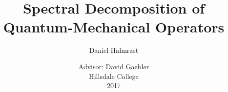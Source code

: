 \documentclass[12pt]{article}
\author{Daniel Halmrast}
\title{Spectral Decomposition of Quantum-Mechanical Operators}
\date{Advisor: David Gaebler\\
        Hillsdale College\\
        2017}
\theoremstyle{definition}
\numberwithin{theorem}{subsection}
\numberwithin{example}{subsection}
\numberwithin{definition}{subsection}
\begin{document}
\maketitle











{}

\end{document}
